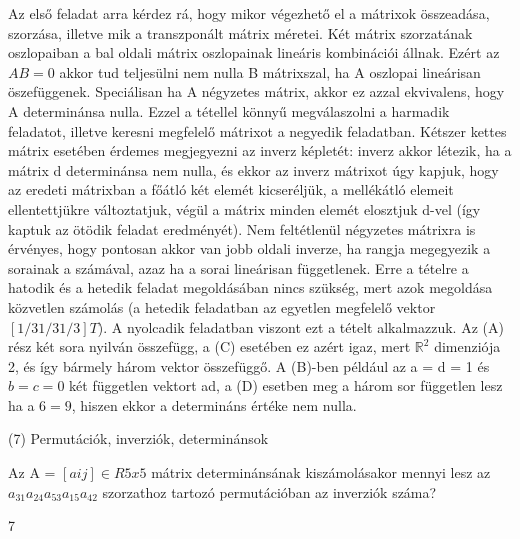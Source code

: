 \begin{frame}
  \begin{tcolorbox}[title={6/8. -Q-}]
Az első feladat arra kérdez rá, hogy mikor végezhető el a mátrixok összeadása, szorzása, illetve mik a transzponált mátrix méretei. Két mátrix szorzatának oszlopaiban a bal oldali mátrix oszlopainak lineáris kombinációi állnak. Ezért az $AB = 0$ akkor tud teljesülni nem nulla B mátrixszal, ha A oszlopai lineárisan öszefüggenek. Speciálisan ha A négyzetes mátrix, akkor ez azzal ekvivalens, hogy A determinánsa nulla. Ezzel a tétellel könnyű megválaszolni a harmadik feladatot, illetve keresni megfelelő mátrixot a negyedik feladatban. Kétszer kettes mátrix esetében érdemes megjegyezni az inverz képletét: inverz akkor létezik, ha a mátrix d determinánsa nem nulla, és ekkor az inverz mátrixot úgy kapjuk, hogy az eredeti mátrixban a főátló két elemét kicseréljük, a mellékátló elemeit ellentettjükre változtatjuk, végül a mátrix minden elemét elosztjuk d-vel (így kaptuk az ötödik feladat eredményét). Nem feltétlenül négyzetes mátrixra is érvényes, hogy pontosan akkor van jobb oldali inverze, ha rangja megegyezik a sorainak a számával, azaz ha a sorai lineárisan függetlenek. Erre a tételre a hatodik és a hetedik feladat megoldásában nincs szükség, mert azok megoldása közvetlen számolás (a hetedik feladatban az egyetlen megfelelő vektor $[1/3 1/3 1/3]T$). A nyolcadik feladatban viszont ezt a tételt alkalmazzuk. Az (A) rész két sora nyilván összefügg, a (C) esetében ez azért igaz, mert $\mathbb{R}^2$ dimenziója 2, és így bármely három vektor összefüggő. A (B)-ben például az a = d = 1 és $b = c = 0$ két független vektort ad, a (D) esetben meg a három sor független lesz ha a $6= 9$, hiszen ekkor a determináns értéke nem nulla.
  \end{tcolorbox}
\end{frame}


\begin{frame}[plain]
\begin{tcolorbox}[center, colback={myyellow}, coltext={black}, colframe={myyellow}]
    {\RHuge  (7) Permutációk, inverziók, determinánsok}
    \mmedskip
\end{tcolorbox}
\end{frame}

\begin{frame}
  \begin{tcolorbox}[title={7/1. -N-}]
    Az A = $[aij] \in R5x5$ mátrix determinánsának kiszámolásakor mennyi lesz az $a_31a_24a_53a_15a_42$ szorzathoz tartozó permutációban az inverziók száma?

  \tcblower

    \mmedskip 
    
    7
  \end{tcolorbox}
\end{frame}


